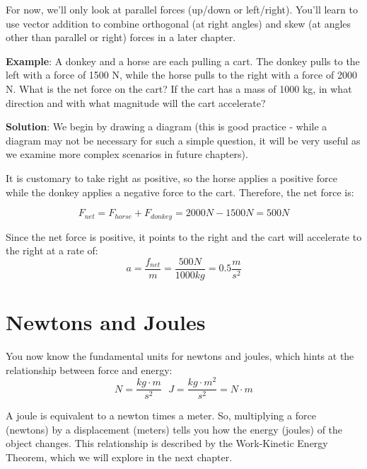 
For now, we'll only look at parallel forces (up/down or left/right). You'll learn to use vector addition to combine orthogonal (at right angles) and skew (at angles other than parallel or right) forces in a later chapter. 

\textbf{Example}: A donkey and a horse are each pulling a cart. The donkey pulls to the left with a force of 1500 N, while the horse pulls to the right with a force of 2000 N. What is the net force on the cart? If the cart has a mass of 1000 kg, in what direction and with what magnitude will the cart accelerate?

\textbf{Solution}: We begin by drawing a diagram (this is good practice - while a diagram may not be necessary for such a simple question, it will be very useful as we examine more complex scenarios in future chapters). 


It is customary to take right as positive, so the horse applies a positive force while the donkey applies a negative force to the cart. Therefore, the net force is:

$$F_{net} = F_{horse} + F_{donkey} = 2000N - 1500N = 500N$$

Since the net force is positive, it points to the right and the cart will accelerate to the right at a rate of:
$$a = \frac{f_{net}}{m} = \frac{500 N}{1000 kg} = 0.5 \frac{m}{s^2}$$

\begin{Exercise}[title = {Net Force and Acceleration}, label = netF]

\end{Exercise}

\begin{Answer}[ref = netF]

\end{Answer}

\section{Newtons and Joules}
You now know the fundamental units for newtons and joules, which hints at the relationship between force and energy:
$$N = \frac{kg \cdot m}{s^2} \text{     } J = \frac{kg \cdot m^2}{s^2} = N \cdot m$$

A joule is equivalent to a newton times a meter. So, multiplying a force (newtons) by a displacement (meters) tells you how the energy (joules) of the object changes. This relationship is described by the Work-Kinetic Energy Theorem, which we will explore in the next chapter. 
